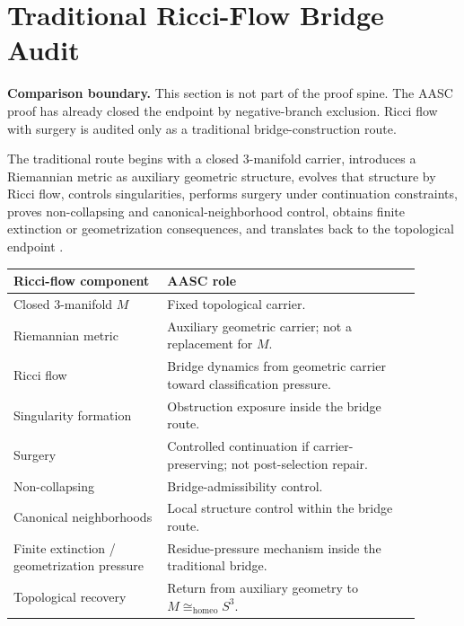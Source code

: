 \documentclass[11pt]{article}
\newcommand{\Sthree}{S^{3}}
\newcommand{\Homeo}{\cong_{\mathrm{homeo}}}
\begin{document}
\section{Traditional Ricci-Flow Bridge Audit}\label{sec:ricci-bridge-audit}

\begin{mdframed}[backgroundcolor=gray!8,linewidth=0.6pt]
\textbf{Comparison boundary.} This section is not part of the proof spine. The AASC proof has already closed the endpoint by negative-branch exclusion. Ricci flow with surgery is audited only as a traditional bridge-construction route.
\end{mdframed}

The traditional route begins with a closed 3-manifold carrier, introduces a Riemannian metric as auxiliary geometric structure, evolves that structure by Ricci flow, controls singularities, performs surgery under continuation constraints, proves non-collapsing and canonical-neighborhood control, obtains finite extinction or geometrization consequences, and translates back to the topological endpoint \cite{Hamilton1982,Perelman2002,Perelman2003Surgery,Perelman2003Extinction,MorganTian2007,KleinerLott2008}.

\begin{longtable}{L{0.34\linewidth}L{0.56\linewidth}}
\toprule
\textbf{Ricci-flow component} & \textbf{AASC role}\\
\midrule
Closed 3-manifold \(M\) & Fixed topological carrier.\\
Riemannian metric & Auxiliary geometric carrier; not a replacement for \(M\).\\
Ricci flow & Bridge dynamics from geometric carrier toward classification pressure.\\
Singularity formation & Obstruction exposure inside the bridge route.\\
Surgery & Controlled continuation if carrier-preserving; not post-selection repair.\\
Non-collapsing & Bridge-admissibility control.\\
Canonical neighborhoods & Local structure control within the bridge route.\\
Finite extinction / geometrization pressure & Residue-pressure mechanism inside the traditional bridge.\\
Topological recovery & Return from auxiliary geometry to \(M\Homeo\Sthree\).\\
\bottomrule
\end{longtable}
\end{document}
